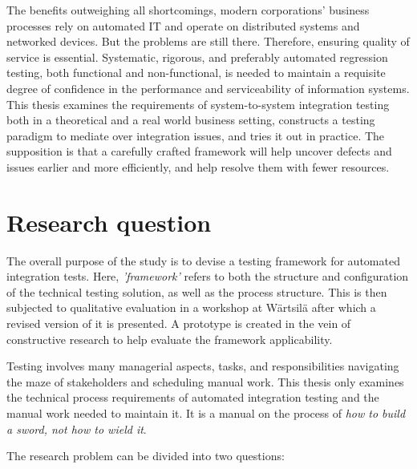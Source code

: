 \documentclass[12pt,a4paper,oneside,pdftex]{report}
\begin{document}
The benefits outweighing all shortcomings, modern corporations' business processes rely on automated IT and operate on distributed systems and networked devices. But the problems are still there. Therefore, ensuring quality of service is essential. Systematic, rigorous, and preferably automated regression testing, both functional and non-functional, is needed to maintain a requisite degree of confidence in the performance and serviceability of information systems. This thesis examines the requirements of system-to-system integration testing both in a theoretical and a real world business setting, constructs a testing paradigm to mediate over integration issues, and tries it out in practice. The supposition is that a carefully crafted framework will help uncover defects and issues earlier and more efficiently, and help resolve them with fewer resources.


\section{Research question}

The overall purpose of the study is to devise a testing framework for automated integration tests. Here, \emph{'framework'} refers to both the structure and configuration of the technical testing solution, as well as the process structure. This is then subjected to qualitative evaluation in a workshop at Wärtsilä after which a revised version of it is presented. A prototype is created in the vein of constructive research to help evaluate the framework applicability.

Testing involves many managerial aspects, tasks, and responsibilities navigating the maze of stakeholders and scheduling manual work. This thesis only examines the technical process requirements of automated integration testing and the manual work needed to maintain it. It is a manual on the process of \emph{how to build a sword, not how to wield it}.

The research problem can be divided into two questions: \\
\end{document}
